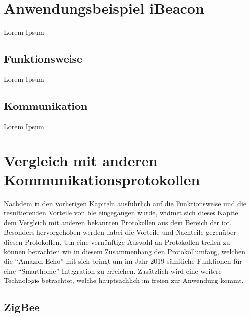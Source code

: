 \section{Anwendungsbeispiel iBeacon}
\label{s:ibeacon}

Lorem Ipsum

\subsection{Funktionsweise}
\label{ss:ibeacon:funktionsweise}

Lorem Ipsum

\subsection{Kommunikation}
\label{ss:ibeacon:kommunikation}

Lorem Ipsum

\section{Vergleich mit anderen Kommunikationsprotokollen}
\label{s:vergleich}

Nachdem in den vorherigen Kapiteln ausführlich auf die Funktionsweise und die resultierenden Vorteile von \ac{ble} eingegangen wurde, widmet sich dieses Kapitel dem Vergleich mit anderen bekannten Protokollen aus dem Bereich der \ac{iot}. Besonders hervorgehoben werden dabei die Vorteile und Nachteile gegenüber diesen Protokollen. Um eine vernünftige Auswahl an Protokollen treffen zu können betrachten wir in diesem Zusammenhang den Protokollumfang, welchen die "`Amazon Echo"' mit sich bringt um im Jahr 2019 sämtliche Funktionen für eine "`Smarthome"' Integration zu erreichen. Zusätzlich wird eine weitere Technologie betrachtet, welche hauptsächlich im freien zur Anwendung kommt.\\  

\subsection{ZigBee}
\label{ss:vergleich:zigbee}

